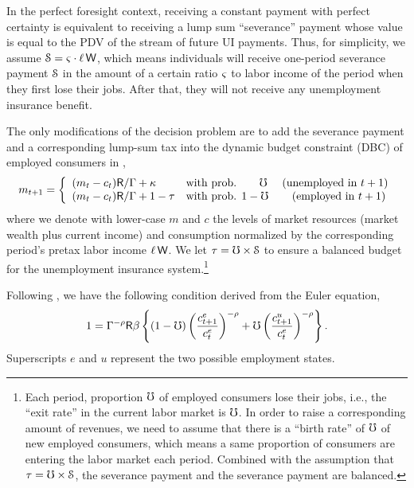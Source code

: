 \documentclass[titlepage]{\econtex}
\begin{document}
In the perfect foresight context, receiving a constant payment with
perfect certainty is equivalent to receiving a lump sum ``severance''
payment whose value is equal to the PDV of the stream of future UI
payments.  Thus, for simplicity, we assume
$\mathcal{S}=\varsigma\cdot\ell\,\mathsf{W}$, which means
individuals will receive one-period severance payment $\mathcal{S}$ in the amount of
a certain ratio $\varsigma$ to labor income of the period when they first lose their jobs. After that, they will not receive any unemployment
insurance benefit.



The only modifications of the decision problem are to add
the severance payment and a corresponding lump-sum tax into the
dynamic budget constraint (DBC) of employed consumers in
\cite{ctDiscrete},
\begin{equation*}
    m_{t+1}=\left\{
    \begin{array}{ll}
    (m_{t}-c_t)\mathsf{R}/\Gamma+\kappa & \mbox{with prob. }\phantom{1-~}\mho \quad \text{          (unemployed in $t+1$)}\\
    (m_{t}-c_t)\mathsf{R}/\Gamma+1-\tau  & \mbox{with prob. }1-\mho           \quad \text{\phantom{un}(employed in $t+1$)}
    \end{array}
  \right.
\end{equation*}
where we denote  with lower-case $m$ and $c$ the levels of market resources (market wealth plus current income) and consumption  normalized by the corresponding period's pretax labor income $\ell\,\mathsf{W}$. We let $\tau=\mho\times
\mathcal{S}$ to ensure a balanced budget for the unemployment
insurance system.\footnote{Each period, proportion
  $\mho$ of employed consumers lose their jobs, i.e., the ``exit
  rate'' in the current labor market is $\mho$.  In order to raise a
  corresponding amount of revenues, we need to assume that there is a
  ``birth rate'' of $\mho$ of new employed consumers, which means a
  same proportion of consumers are entering the labor market each
  period. Combined with the assumption that $\tau=\mho\times
  \mathcal{S}$, the severance payment and the severance payment are
  balanced.}

Following \cite{ctDiscrete}, we have the following condition derived from the Euler equation,
\begin{equation*}
  1  = \Gamma^{-\rho}\mathsf{R}\beta \left\{(1-\mho)\left(\frac{c^{e}_{t+1}}{c^{e}_{t}}\right)^{-\rho}+\mho \left(\frac{c^{u}_{t+1}}{c^{e}_{t}}\right)^{-\rho}\right\}.
\end{equation*}
Superscripts $e$ and $u$ represent the two
possible employment states.
\end{document}
